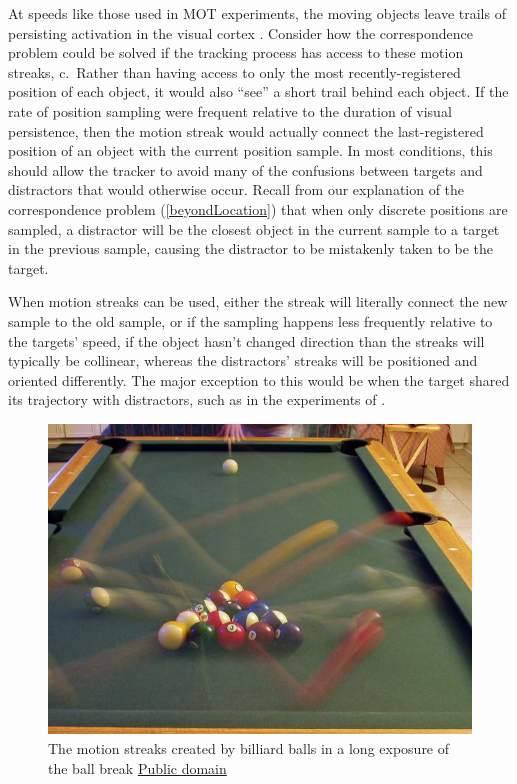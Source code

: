 \documentclass[
]{book}
\begin{document}
At speeds like those used in MOT experiments, the moving objects leave trails of persisting activation in the visual cortex \citep[e.g.][]{apthorpDirectEvidenceEncoding2013}. Consider how the correspondence problem could be solved if the tracking process has access to these motion streaks, c.~Rather than having access to only the most recently-registered position of each object, it would also ``see'' a short trail behind each object. If the rate of position sampling were frequent relative to the duration of visual persistence, then the motion streak would actually connect the last-registered position of an object with the current position sample. In most conditions, this should allow the tracker to avoid many of the confusions between targets and distractors that would otherwise occur. Recall from our explanation of the correspondence problem (\ref{beyondLocation}) that when only discrete positions are sampled, a distractor will be the closest object in the current sample to a target in the previous sample, causing the distractor to be mistakenly taken to be the target.

When motion streaks can be used, either the streak will literally connect the new sample to the old sample, or if the sampling happens less frequently relative to the targets' speed, if the object hasn't changed direction than the streaks will typically be collinear, whereas the distractors' streaks will be positioned and oriented differently. The major exception to this would be when the target shared its trajectory with distractors, such as in the experiments of \citet{holcombeSplittingAttentionReduces2013}.



\begin{figure}
\includegraphics[width=0.8\linewidth]{imagesForRmd/motionBlur/8_ball_break_time_lapsePublicDomain} \caption{The motion streaks created by billiard balls in a long exposure of the ball break \href{https://commons.wikimedia.org/wiki/File:8_ball_break_time_lapse.jpg}{Public domain}}\label{fig:billiardsBlur}
\end{figure}
\end{document}
